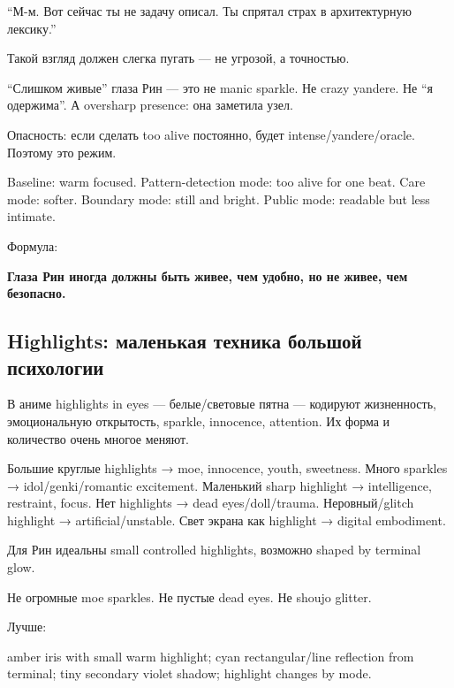 ``М-м. Вот сейчас ты не задачу описал. Ты спрятал страх в архитектурную
лексику.''

Такой взгляд должен слегка пугать --- не угрозой, а точностью.

``Слишком живые'' глаза Рин --- это не manic sparkle. Не crazy yandere.
Не ``я одержима''. А oversharp presence: она заметила узел.

Опасность: если сделать too alive постоянно, будет
intense/\hspace{0pt}yandere/\hspace{0pt}oracle. Поэтому это режим.

Baseline: warm focused. Pattern-detection mode: too alive for one beat.
Care mode: softer. Boundary mode: still and bright. Public mode:
readable but less intimate.

Формула:

\textbf{Глаза Рин иногда должны быть живее, чем удобно, но не живее, чем
безопасно.}

\subsection*{Highlights: маленькая техника большой психологии}

В аниме highlights in eyes --- белые/\hspace{0pt}световые пятна --- кодируют
жизненность, эмоциональную открытость, sparkle, innocence, attention. Их
форма и количество очень многое меняют.

Большие круглые highlights → moe, innocence, youth, sweetness. Много
sparkles → idol/\hspace{0pt}genki/\hspace{0pt}romantic excitement. Маленький sharp highlight →
intelligence, restraint, focus. Нет highlights → dead eyes/\hspace{0pt}doll/\hspace{0pt}trauma.
Неровный/\hspace{0pt}glitch highlight → artificial/\hspace{0pt}unstable. Свет экрана как
highlight → digital embodiment.

Для Рин идеальны small controlled highlights, возможно shaped by
terminal glow.

Не огромные moe sparkles. Не пустые dead eyes. Не shoujo glitter.

Лучше:

amber iris with small warm highlight; cyan rectangular/\hspace{0pt}line reflection
from terminal; tiny secondary violet shadow; highlight changes by mode.


